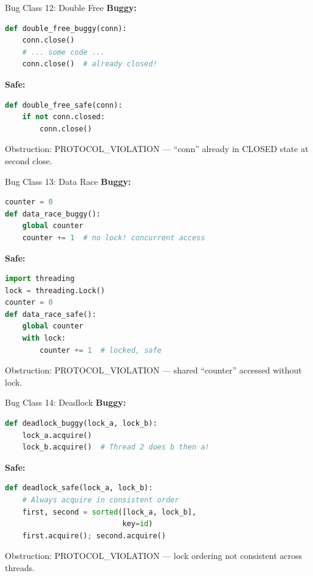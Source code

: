 \documentclass[aspectratio=169,10pt]{beamer}
\newcommand{\warn}[1]{\begin{center}
  \colorbox{warnbg}{\parbox{0.88\textwidth}{\centering\small #1}}\end{center}}
\begin{document}
\begin{frame}[fragile]{Bug Class 12: Double Free}
\textbf{Buggy:}
\begin{lstlisting}[language=Python, basicstyle=\ttfamily\scriptsize]
def double_free_buggy(conn):
    conn.close()
    # ... some code ...
    conn.close()  # already closed!
\end{lstlisting}
\textbf{Safe:}
\begin{lstlisting}[language=Python, basicstyle=\ttfamily\scriptsize]
def double_free_safe(conn):
    if not conn.closed:
        conn.close()
\end{lstlisting}
\warn{Obstruction: PROTOCOL\_VIOLATION --- ``conn'' already in CLOSED state at second close.}
\end{frame}

\begin{frame}[fragile]{Bug Class 13: Data Race}
\textbf{Buggy:}
\begin{lstlisting}[language=Python, basicstyle=\ttfamily\scriptsize]
counter = 0
def data_race_buggy():
    global counter
    counter += 1  # no lock! concurrent access
\end{lstlisting}
\textbf{Safe:}
\begin{lstlisting}[language=Python, basicstyle=\ttfamily\scriptsize]
import threading
lock = threading.Lock()
counter = 0
def data_race_safe():
    global counter
    with lock:
        counter += 1  # locked, safe
\end{lstlisting}
\warn{Obstruction: PROTOCOL\_VIOLATION --- shared ``counter'' accessed without lock.}
\end{frame}

\begin{frame}[fragile]{Bug Class 14: Deadlock}
\textbf{Buggy:}
\begin{lstlisting}[language=Python, basicstyle=\ttfamily\scriptsize]
def deadlock_buggy(lock_a, lock_b):
    lock_a.acquire()
    lock_b.acquire()  # Thread 2 does b then a!
\end{lstlisting}
\textbf{Safe:}
\begin{lstlisting}[language=Python, basicstyle=\ttfamily\scriptsize]
def deadlock_safe(lock_a, lock_b):
    # Always acquire in consistent order
    first, second = sorted([lock_a, lock_b],
                           key=id)
    first.acquire(); second.acquire()
\end{lstlisting}
\warn{Obstruction: PROTOCOL\_VIOLATION --- lock ordering not consistent across threads.}
\end{frame}
\end{document}
